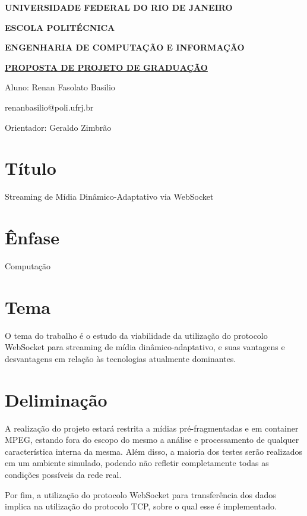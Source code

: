 \documentclass[a4paper,12pt]{article}
\begin{document}
\begin{center}
\textbf{UNIVERSIDADE FEDERAL DO RIO DE JANEIRO}
\vspace{-0.2cm}

\textbf{ESCOLA POLITÉCNICA}
\vspace{-0.2cm}

\textbf{ENGENHARIA DE COMPUTAÇÃO E INFORMAÇÃO}
\vspace{0.8cm}

\underline{\textbf{PROPOSTA DE PROJETO DE GRADUAÇÃO}}

Aluno: Renan Fasolato Basilio
\vspace{-0.2cm}

renanbasilio@poli.ufrj.br

Orientador: Geraldo Zimbrão
\end{center}

\section{Título}

Streaming de Mídia Dinâmico-Adaptativo via WebSocket

\section{Ênfase}

Computação

\section{Tema}

O tema do trabalho é o estudo da viabilidade da utilização do protocolo WebSocket para streaming de mídia dinâmico-adaptativo, e suas vantagens e desvantagens em relação às tecnologias atualmente dominantes.

\section{Deliminação}

A realização do projeto estará restrita a mídias pré-fragmentadas e em container MPEG, estando fora do escopo do mesmo a análise e processamento de qualquer característica interna da mesma. Além disso, a maioria dos testes serão realizados em um ambiente simulado, podendo não refletir completamente todas as condições possíveis da rede real.

Por fim, a utilização do protocolo WebSocket para transferência dos dados implica na utilização 
do protocolo TCP, sobre o qual esse é implementado.
\end{document}

